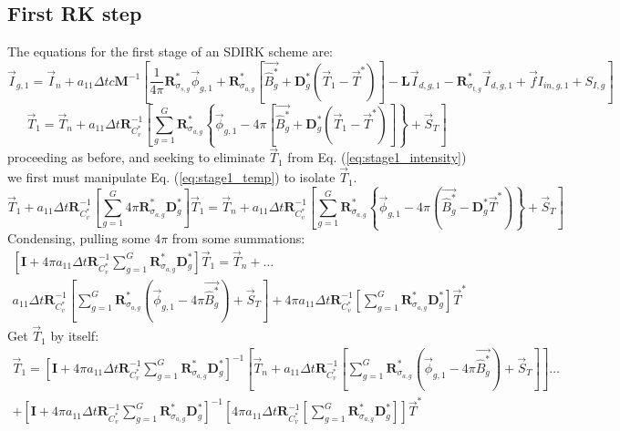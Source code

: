 \documentclass[11pt]{article}
\newcommand{\benum}{\begin{equation}}
\newcommand{\eenum}{\end{equation}}
\newcommand{\be}{\begin{equation*}}
\newcommand{\ee}{\end{equation*}}
\newcommand{\eqt}[1]{Eq. (\ref{#1})}
\newcommand{\M}{\ensuremath{ \mathbf M}}
\newcommand{\R}{\ensuremath{{\mathbf R}}}
\newcommand{\Rag}{\ensuremath{{\mathbf R}_{\sigma_{a,g}}^*}}
\newcommand{\Rsg}{\ensuremath{{\mathbf R}_{\sigma_{s,g}}^*}}
\newcommand{\Rtg}{\ensuremath{{\mathbf R}_{\sigma_{t,g}}^*}}
\newcommand{\Dg}{\ensuremath{ \mathbf D}^*_g}
\newcommand{\Pgvec}{\ensuremath{ \vec{\widehat{B}^*_g}}}
\newcommand{\I}{\ensuremath{\mathbf{I}}}
\begin{document}
\subsection{First RK step}

The equations for the first stage of an SDIRK scheme are:
\benum
\vec{I}_{g,1} = \vec{I}_n + a_{11} \Delta t c\M^{-1}\left[ \frac{1}{4\pi} \Rsg \vec{\phi}_{g,1} + \Rag \left[\Pgvec + \Dg \left(\vec{T}_1- \vec{T}^*  \right)  \right] - \mathbf{L} \vec{I}_{d,g,1} - \Rtg \vec{I}_{d,g,1} + \vec{f}I_{in,g,1} + S_{I,g} \right]
\label{eq:stage1_intensity}
\eenum
\benum
\vec{T}_{1} = \vec{T}_n + a_{11}\Delta t \R_{C_v^*}^{-1}\left[\sum_{g=1}^G{ \Rag \left \{ \vec{\phi}_{g,1} - 4\pi\left[\Pgvec +   \Dg \left(\vec{T}_1 - \vec{T}^*  \right)\right]   \right \} } + \vec{S}_T \right]
\label{eq:stage1_temp}
\eenum
proceeding as before, and seeking to eliminate $\vec{T}_1$ from \eqt{eq:stage1_intensity} we first must manipulate \eqt{eq:stage1_temp} to isolate $\vec{T}_1$.
\be
\vec{T}_1 + a_{11}\Delta t \R_{C_v^*}^{-1}\left[\sum_{g=1}^G{ 4\pi \Rag \Dg}  \right]\vec{T}_1 = \vec{T}_n + 
a_{11}\Delta t \R_{C_v^*}^{-1} \left[ \sum_{g=1}^G{ \Rag \left \{ \vec{\phi}_{g,1} - 4\pi\left( \Pgvec - \Dg \vec{T}^*\right) \right \} }  + \vec{S}_T \right]
\ee
%
Condensing, pulling some $4\pi$ from some summations:
%
\begin{multline*}
\left[\I+ 4\pi a_{11} \Delta t \R_{C_v^*}^{-1}\sum_{g=1}^G{ \Rag \Dg  }\right] \vec{T}_1 = \vec{T}_n + \dots \\
a_{11} \Delta t \R_{C_v^*}^{-1} \left[ \sum_{g=1}^G{ \Rag \left( \vec{\phi}_{g,1} - 4\pi \Pgvec  \right ) } + \vec{S}_T \right]+
4\pi a_{11} \Delta t \R_{C_v^*}^{-1}\left[\sum_{g=1}^G{\Rag \Dg } \right]\vec{T}^*
\end{multline*}
%
Get $\vec{T}_1$ by itself:
%
\begin{multline*}
\vec{T}_1 = \left[\I + 4\pi a_{11} \Delta t \R_{C_v^*}^{-1} \sum_{g=1}^G{ \Rag \Dg  }\right]^{-1}
\left[\vec{T}_n + 
a_{11} \Delta t \R_{C_v^*}^{-1} \left[ \sum_{g=1}^G{ \Rag \left( \vec{\phi}_{g,1} - 4\pi \Pgvec  \right) }  + \vec{S}_T \right] \right]\dots \\
+  \left[\I+ 4\pi a_{11} \Delta t \R_{C_v^*}^{-1}\sum_{g=1}^G{\Rag \Dg }\right]^{-1}
\left[ 4\pi a_{11} \Delta t \R_{C_v^*}^{-1}\left[\sum_{g=1}^G{\Rag \Dg } \right]  \right]\vec{T}^*
\end{multline*}
\end{document}
